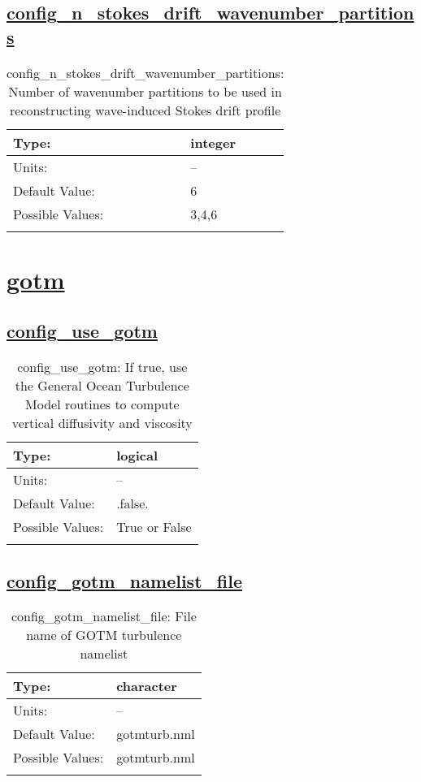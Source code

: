\subsection[config\_n\_stokes\_drift\_wavenumber\_partitions]{\hyperref[sec:nm_tab_wave_coupling]{config\_n\_stokes\_drift\_wavenumber\_partitions}}
\label{subsec:nm_sec_config_n_stokes_drift_wavenumber_partitions}
\begin{center}
\begin{longtable}{| p{2.0in} || p{4.0in} |}
    \hline
    Type: & integer \\
    \hline
    Units: & -- \\
    \hline
    Default Value: & 6 \\
    \hline
    Possible Values: & 3,4,6 \\
    \hline
    \caption{config\_n\_stokes\_drift\_wavenumber\_partitions: Number of wavenumber partitions to be used in reconstructing wave-induced Stokes drift profile}
\end{longtable}
\end{center}
\section[gotm]{\hyperref[sec:nm_tab_gotm]{gotm}}
\label{sec:nm_sec_gotm}
\subsection[config\_use\_gotm]{\hyperref[sec:nm_tab_gotm]{config\_use\_gotm}}
\label{subsec:nm_sec_config_use_gotm}
\begin{center}
\begin{longtable}{| p{2.0in} || p{4.0in} |}
    \hline
    Type: & logical \\
    \hline
    Units: & -- \\
    \hline
    Default Value: & .false. \\
    \hline
    Possible Values: & True or False \\
    \hline
    \caption{config\_use\_gotm: If true, use the General Ocean Turbulence Model routines to compute vertical diffusivity and viscosity}
\end{longtable}
\end{center}
\subsection[config\_gotm\_namelist\_file]{\hyperref[sec:nm_tab_gotm]{config\_gotm\_namelist\_file}}
\label{subsec:nm_sec_config_gotm_namelist_file}
\begin{center}
\begin{longtable}{| p{2.0in} || p{4.0in} |}
    \hline
    Type: & character \\
    \hline
    Units: & -- \\
    \hline
    Default Value: & gotmturb.nml \\
    \hline
    Possible Values: & gotmturb.nml \\
    \hline
    \caption{config\_gotm\_namelist\_file: File name of GOTM turbulence namelist}
\end{longtable}
\end{center}
